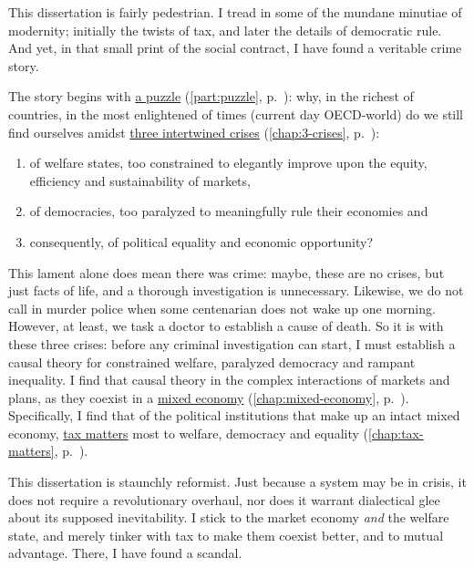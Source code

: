 


This dissertation is fairly pedestrian.
I tread in some of the mundane minutiae of modernity;
initially the twists of tax, and later the details of democratic rule.
And yet, in that small print of the social contract, I have found a veritable crime story.

The story begins with \hyperref[part:puzzle]{a puzzle} (\autoref{part:puzzle}, p.~\pageref{part:puzzle}):
why, in the richest of countries, in the most enlightened of times (current day \gls{OECD}-world) do we still find ourselves amidst \hyperref[chap:3-crises]{three intertwined crises} (\autoref{chap:3-crises}, p.~\pageref{chap:3-crises}):

\begin{enumerate}
	\item of welfare states, too constrained to elegantly improve upon the equity, efficiency and sustainability of markets,
	\item of democracies, too paralyzed to meaningfully rule their economies and
	\item consequently, of political equality and economic opportunity?
\end{enumerate}

This lament alone does mean there was crime:
maybe, these are no crises, but just facts of life, and a thorough investigation is unnecessary.
Likewise, we do not call in murder police when some centenarian does not wake up one morning.
However, at least, we task a doctor to establish a cause of death.
So it is with these three crises:
before any criminal investigation can start, I must establish a causal theory for constrained welfare, paralyzed democracy and rampant inequality.
I find that causal theory in the complex interactions of markets and plans, as they coexist in a \hyperref[chap:mixed-economy]{mixed economy} (\autoref{chap:mixed-economy}, p.~\pageref{chap:mixed-economy}).
Specifically, I find that of the political institutions that make up an intact mixed economy, \hyperref[chap:tax-matters]{tax matters} most to welfare, democracy and equality (\autoref{chap:tax-matters}, p.~\pageref{chap:tax-matters}).

This dissertation is staunchly reformist.
Just because a system may be in crisis, it does not require a revolutionary overhaul, nor does it warrant dialectical glee about its supposed inevitability.
I stick to the market economy \emph{and} the welfare state, and merely tinker with tax to make them coexist better, and to mutual advantage.
There, I have found a scandal.

